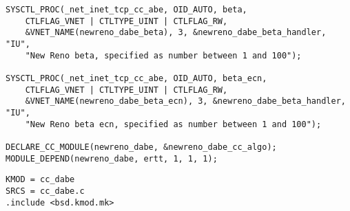 \begin{code}
\begin{verbatim}
SYSCTL_PROC(_net_inet_tcp_cc_abe, OID_AUTO, beta,
    CTLFLAG_VNET | CTLTYPE_UINT | CTLFLAG_RW,
    &VNET_NAME(newreno_dabe_beta), 3, &newreno_dabe_beta_handler, "IU",
    "New Reno beta, specified as number between 1 and 100");

SYSCTL_PROC(_net_inet_tcp_cc_abe, OID_AUTO, beta_ecn,
    CTLFLAG_VNET | CTLTYPE_UINT | CTLFLAG_RW,
    &VNET_NAME(newreno_dabe_beta_ecn), 3, &newreno_dabe_beta_handler, "IU",
    "New Reno beta ecn, specified as number between 1 and 100");

DECLARE_CC_MODULE(newreno_dabe, &newreno_dabe_cc_algo);
MODULE_DEPEND(newreno_dabe, ertt, 1, 1, 1);
\end{verbatim}
\label{code:dabe.c}
\end{code}

\begin{code}
\begin{verbatim}
KMOD = cc_dabe
SRCS = cc_dabe.c
.include <bsd.kmod.mk>
\end{verbatim}
\label{code:dabe-makefile}
\end{code}